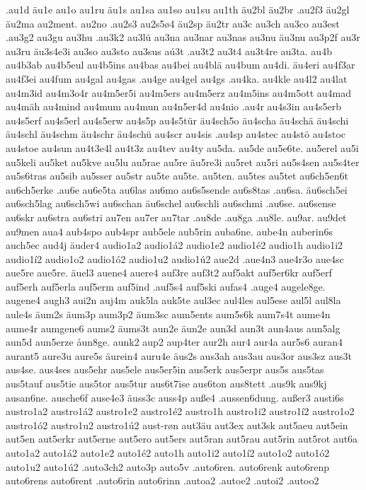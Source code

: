 .au1d
äu1e
au1o
au1ru
äu1s
au1sa
au1so
au1su
au1th
äu2bl
äu2br
.au2f3
äu2gl
äu2ma
au2ment.
au2no
.au2s3
au2s5ø4
äu2sp
äu2tr
au3c
au3ch
au3co
au3est
.au3g2
au3gu
au3hu
.au3k2
au3lü
au3na
au3nar
au3nas
au3nu
äu3nu
au3p2f
au3r
au3ru
äu3s4e3i
au3so
au3sto
au3sus
aú3t
.au3t2
au3t4
au3t4re
au3ta.
au4b
au4b3ab
au4b5eul
au4b5ins
au4bas
au4bei
au4blä
au4bum
au4di.
äu4eri
au4f3ar
au4f3ei
au4fum
au4gal
au4gas
.au4ge
au4gel
au4gs
.au4ka.
au4kle
au4l2
au4lat
au4m3id
au4m3o4r
au4m5er5i
au4m5ers
au4m5erz
au4m5ins
au4m5ott
au4mad
au4mäh
au4mind
au4mum
au4mun
au4n5er4d
au4nio
.au4r
au4s3in
au4s5erb
au4s5erf
au4s5erl
au4s5erw
au4s5p
au4s5tür
äu4sch5o
äu4scha
äu4schä
äu4schi
äu4schl
äu4schm
äu4schr
äu4schü
au4scr
au4sis
.au4sp
au4stec
au4stö
au4stoc
au4stoe
au4sun
au4t3e4l
au4t3z
au4tev
au4ty
au5da.
au5de
au5e6te.
au5erel
au5i
au5keli
au5ket
au5kve
au5lu
au5rae
au5re
äu5re3i
au5ret
au5ri
au5s4sen
au5s4ter
au5s6tras
au5sib
au5sser
au5str
au5te
au5te.
au5ten.
au5tes
au5tet
au6ch5en6t
au6ch5erke
.au6e
au6e5ta
au6las
au6mo
au6s5sende
au6s8tas
.au6sa.
äu6sch5ei
au6sch5lag
au6sch5wi
au6schan
äu6schel
au6schli
au6schmi
.au6se.
au6sense
au6skr
au6stra
au6stri
au7en
au7er
au7tar
.au8de
.au8ga
.au8le.
au9ar.
au9det
au9men
aua4
aub4spo
aub4spr
aub5ele
aub5rin
auba6ne.
aube4n
auberin6s
auch5ec
aud4j
äuder4
audio1a2
audio1á2
audio1e2
audio1é2
audio1h
audio1i2
audio1í2
audio1o2
audio1ó2
audio1u2
audio1ú2
aue2d
.aue4n3
aue4r3o
aue4sc
aue5re
aue5re.
äuel3
auene4
auere4
auf3re
auf3t2
auf5akt
auf5er6kr
auf5erf
auf5erh
auf5erla
auf5erm
auf5ind
.auf5s4
auf5ski
aufas4
.auge4
augele8ge.
augene4
augh3
aui2n
auj4m
auk5la
auk5te
aul3ec
aul4les
aul5ese
aul5l
aul8la
aule4s
äum2s
äum3p
aum3p2
äum3sc
aum5ents
aum5s6k
aum7s4t
aume4n
aume4r
aumgene6
aums2
äums3t
aun2e
äun2e
aun3d
aun3t
aun4aus
aun5alg
aun5d
aun5erze
åun8ge.
aunk2
aup2
aup4ter
aur2h
aur4
aur4a
aur5s6
auran4
aurant5
aure3u
aure5s
äurein4
auru4e
äus2s
aus3ah
aus3au
aus3or
aus3sz
aus3t
aus4se.
aus4ses
aus5ehr
aus5ele
aus5er5in
aus5erk
aus5erpr
aus5s
aus5tas
aus5tauf
aus5tie
aus5tor
aus5tur
aus6t7ise
aus6ton
aus8tett
.aus9k
aus9kj
ausan6ne.
ausche6f
ause4e3
äuss3c
auss4p
auße4
.aussen6dung.
außer3
austi6s
austro1a2
austro1á2
austro1e2
austro1é2
austro1h
austro1i2
austro1í2
austro1o2
austro1ó2
austro1u2
austro1ú2
aust-røn
aut3äu
aut3ex
aut3sk
aut5aeu
aut5ein
aut5en
aut5erkr
aut5erne
aut5ero
aut5ers
aut5ran
aut5rau
aut5rin
aut5rot
aut6a
auto1a2
auto1á2
auto1e2
auto1é2
auto1h
auto1i2
auto1í2
auto1o2
auto1ó2
auto1u2
auto1ú2
.auto3ch2
auto3p
auto5v
.auto6ren.
auto6renk
auto6renp
auto6rens
auto6rent
.auto6rin
auto6rinn
.autoa2
.autoe2
.autoi2
.autoo2
